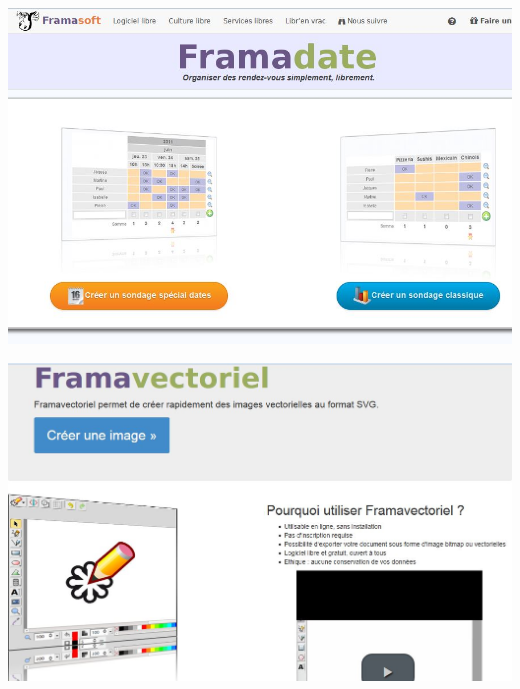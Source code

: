 \documentclass{beamer}
\begin{document}
\begin{frame}
\begin{center}
\includegraphics[scale=0.5]{./images/Framadate.jpg}
\end{center}
\end{frame}

\begin{frame}
\begin{center}
\includegraphics[scale=0.5]{./images/Framavectoriel.jpg}
\end{center}
\end{frame}
\end{document}
